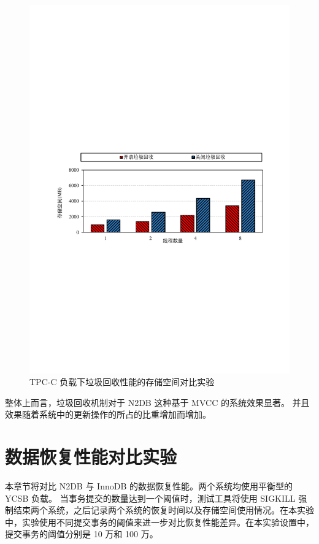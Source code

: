 \begin{figure}
    \centering
    \includegraphics[width=15cm, trim={1cm 9cm 1cm 10cm}]{figures/gc-tpcc-storage.pdf}
    \caption{TPC-C 负载下垃圾回收性能的存储空间对比实验}
    \label{fig:gc-storage-tpcc}
\end{figure}

整体上而言，垃圾回收机制对于 N2DB 这种基于 MVCC 的系统效果显著。
并且效果随着系统中的更新操作的所占的比重增加而增加。


\section{数据恢复性能对比实验}

本章节将对比 N2DB 与 InnoDB 的数据恢复性能。两个系统均使用平衡型的 YCSB 负载。
当事务提交的数量达到一个阈值时，测试工具将使用 SIGKILL 强制结束两个系统，之后记录两个系统的恢复时间以及存储空间使用情况。在本实验中，实验使用不同提交事务的阈值来进一步对比恢复性能差异。在本实验设置中，提交事务的阈值分别是 10 万和 100 万。

